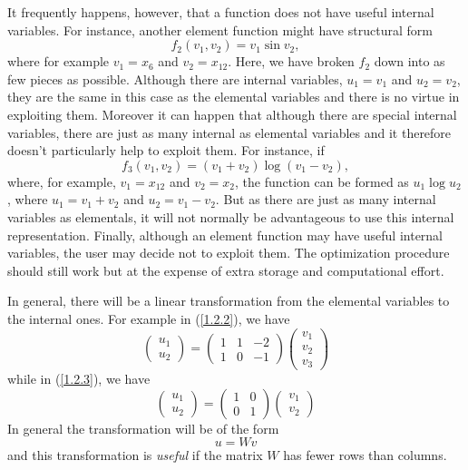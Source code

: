 \documentclass[a4paper]{article}
\newcommand{\beqn}[1]{\begin{equation}\label{#1}}
\newcommand{\eeqn}{\end{equation}}
\newcommand{\req}[1]{(\ref{#1})}
\begin{document}
It frequently happens,  however, that a function does  not have useful
internal variables.
For instance, another element function
might have structural form
\beqn{1.2.3}
f_2 (v_1, v_2) = v_1 \sin v_2,
\eeqn
where for example  $v_1 =  x_6$  and  $v_2 =  x_{12}$.  Here, we  have
broken $f_2$ down  into as few  pieces as possible. Although there are
internal variables, $u_1 = v_1$ and $u_2 =  v_2$, they are the same in
this case  as   the  elemental variables
and  there is  no virtue  in
exploiting  them.  Moreover  it  can happen that   although there  are
special   internal  variables,
there  are  just as   many  internal as
elemental   variables  and it therefore   doesn't particularly help to
exploit them.  For instance, if
\beqn{1.2.4}
f_3 (v_1, v_2) = (v_1 + v_2) \log (v_1 - v_2),
\eeqn
where, for example,  $v_1 = x_{12}$ and $v_2  = x_2$, the function can
be formed as $u_1 \log u_2$, where $u_1 = v_1 + v_2$  and $u_2  = v_1-
v_2$. But as there are just as many internal  variables as elementals,
it will    not  normally  be   advantageous   to use  this    internal
representation.
Finally,  although   an element  function
may have  useful  internal
variables, the user may decide not to exploit  them.  The optimization
procedure  should still work  but at the expense of  extra storage
and computational effort.

In general, there will be a linear transformation
from the elemental variables to the internal ones. For example in
\req{1.2.2}, we have
\beqn{1.2.5}
\left( \begin{array}{c}
                         u_1 \\ u_2
                        \end{array} \right) =
                 \left( \begin{array}{rrr}
                         1 &  1 &  -2 \\
                         1 &  0 &  -1
                        \end{array} \right)
                 \left( \begin{array}{c}
                         v_1 \\ v_2\\ v_3
                        \end{array} \right)
\eeqn
while in \req{1.2.3}, we have
\beqn{1.2.6}
\left( \begin{array}{c}
                          u_1 \\ u_2
                        \end{array} \right) =
                 \left( \begin{array}{rr} 1 & 0 \\
                                          0 & 1
                         \end{array} \right)
                 \left( \begin{array}{c} v_1 \\ v_2
                 \end{array} \right)
\eeqn
In general the transformation will be of the form
\beqn{1.2.7}
u = Wv
\eeqn
and  this transformation is  {\em useful} if the  matrix $W$ has fewer
rows than columns.
\end{document}
